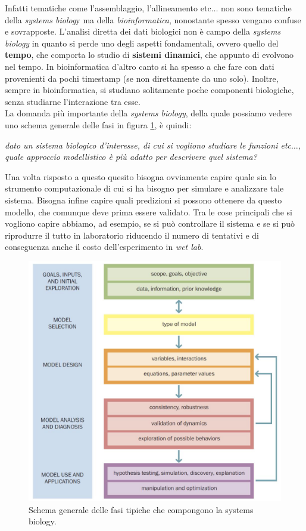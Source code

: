 \documentclass[a4paper,12pt, oneside]{book}
\begin{document}
Infatti tematiche come l'assemblaggio, l'allineamento etc$\ldots$ non sono
tematiche della \textit{systems biolog}y ma della \textit{bioinformatica},
nonostante spesso vengano confuse e sovrapposte. L'analisi diretta dei dati
biologici non è campo della \textit{systems biology} in quanto si perde uno
degli aspetti fondamentali, ovvero quello del \textbf{tempo}, che comporta lo
studio di \textbf{sistemi dinamici}, che appunto di evolvono nel tempo. In
bioinformatica d'altro canto si ha spesso a che fare con dati provenienti da
pochi timestamp (se non direttamente da uno solo). Inoltre, sempre in
bioinformatica, si studiano solitamente poche componenti biologiche, senza
studiarne l'interazione tra esse.\\
La domanda più importante della \textit{systems biology}, della quale possiamo
vedere uno schema generale delle fasi in figura \ref{fig:csb2}, è quindi:
\begin{center}
  \textit{dato un sistema biologico d'interesse, di cui si vogliono studiare le
    funzioni etc$\ldots$, quale approccio modellistico è più adatto per
    descrivere quel sistema?}
\end{center}
Una volta risposto a questo quesito bisogna ovviamente capire quale sia lo
strumento computazionale di cui si ha bisogno per simulare e analizzare tale
sistema. Bisogna infine capire quali predizioni si possono ottenere da questo
modello, che comunque deve prima essere validato. Tra le cose principali che si
vogliono capire abbiamo, ad esempio, se si può controllare il sistema e se si
può riprodurre il tutto in laboratorio riducendo il numero di tentativi e di
conseguenza anche il costo dell'esperimento in \textit{wet lab}.\\
\begin{figure}
  \centering
  \includegraphics[scale = 0.3]{img/csb2.jpg}
  \caption{Schema generale delle fasi tipiche che compongono la systems
    biology.} 
  \label{fig:csb2}
\end{figure}
\end{document}
